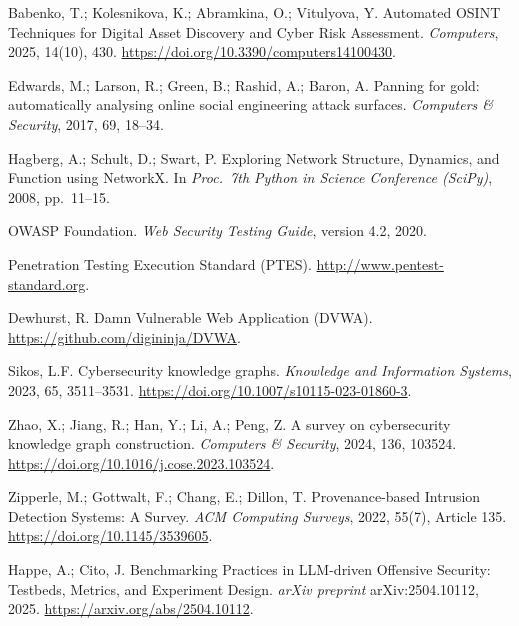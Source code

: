 \documentclass[11pt,a4paper]{article}
\begin{document}
\begin{enumerate}[leftmargin=*,label={[\arabic*]}]
\item Babenko, T.; Kolesnikova, K.; Abramkina, O.; Vitulyova, Y. Automated OSINT Techniques for Digital Asset Discovery and Cyber Risk Assessment. \textit{Computers}, 2025, 14(10), 430. \url{https://doi.org/10.3390/computers14100430}.
\item Edwards, M.; Larson, R.; Green, B.; Rashid, A.; Baron, A. Panning for gold: automatically analysing online social engineering attack surfaces. \textit{Computers \& Security}, 2017, 69, 18--34.
\item Hagberg, A.; Schult, D.; Swart, P. Exploring Network Structure, Dynamics, and Function using NetworkX. In \textit{Proc.\ 7th Python in Science Conference (SciPy)}, 2008, pp.\ 11--15.
\item OWASP Foundation. \textit{Web Security Testing Guide}, version 4.2, 2020.
\item Penetration Testing Execution Standard (PTES). \url{http://www.pentest-standard.org}.
\item Dewhurst, R. Damn Vulnerable Web Application (DVWA). \url{https://github.com/digininja/DVWA}.
\item Sikos, L.F. Cybersecurity knowledge graphs. \textit{Knowledge and Information Systems}, 2023, 65, 3511--3531. \url{https://doi.org/10.1007/s10115-023-01860-3}.
\item Zhao, X.; Jiang, R.; Han, Y.; Li, A.; Peng, Z. A survey on cybersecurity knowledge graph construction. \textit{Computers \& Security}, 2024, 136, 103524. \url{https://doi.org/10.1016/j.cose.2023.103524}.
\item Zipperle, M.; Gottwalt, F.; Chang, E.; Dillon, T. Provenance-based Intrusion Detection Systems: A Survey. \textit{ACM Computing Surveys}, 2022, 55(7), Article 135. \url{https://doi.org/10.1145/3539605}.
\item Happe, A.; Cito, J. Benchmarking Practices in LLM-driven Offensive Security: Testbeds, Metrics, and Experiment Design. \textit{arXiv preprint} arXiv:2504.10112, 2025. \url{https://arxiv.org/abs/2504.10112}.
\end{enumerate}
\end{document}
